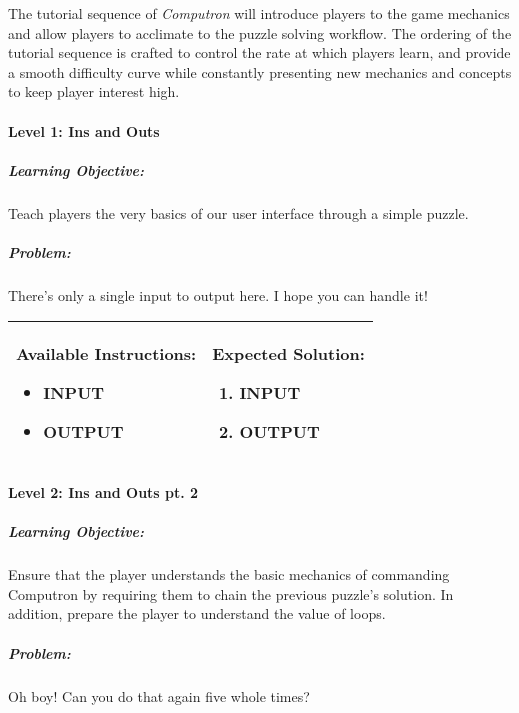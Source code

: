 The tutorial sequence of \textit{Computron} will introduce players to the game mechanics and allow players to acclimate to the puzzle solving workflow. The ordering of the tutorial sequence is crafted to control the rate at which players learn, and provide a smooth difficulty curve while constantly presenting new mechanics and concepts to keep player interest high.\\

\paragraph{Level 1: Ins and Outs}
\subparagraph{Learning Objective:} Teach players the very basics of our user interface through a simple puzzle.

\subparagraph{Problem:} There's only a single input to output here. I hope you can handle it!

\begin{center}
    \begin{tabular}{ | m{6cm} | m{8cm} | } 
        \hline
            \textbf{Available Instructions:} 
            \begin{itemize}
                \setlength\itemsep{-.35em}
                \item INPUT
                \item OUTPUT
            \end{itemize}& 
            \textbf{Expected Solution:} 
            \begin{enumerate}
                \setlength\itemsep{-.35em}
                \item INPUT
                \item OUTPUT
            \end{enumerate}
            \\
        \hline
    \end{tabular}
\end{center}


\paragraph{Level 2: Ins and Outs pt. 2}
\subparagraph{Learning Objective:} Ensure that the player understands the basic mechanics of commanding Computron by requiring them to chain the previous puzzle's solution. In addition, prepare the player to understand the value of loops.

\subparagraph{Problem:} Oh boy! Can you do that again five whole times?

